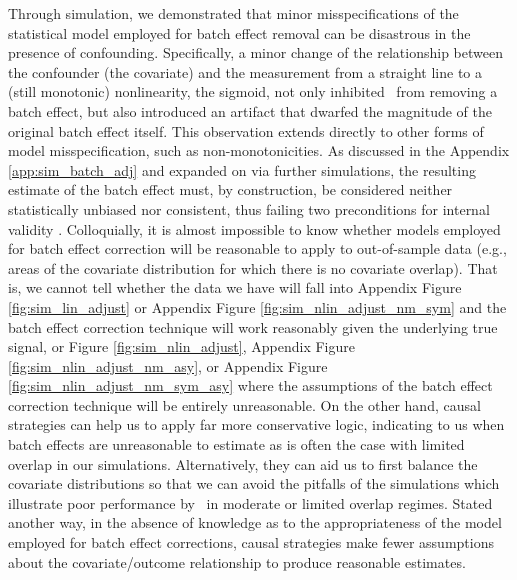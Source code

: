 Through simulation, we demonstrated that minor misspecifications of the statistical model employed for batch effect removal can be disastrous in the presence of confounding. Specifically, a minor change of the relationship between the confounder (the covariate) and the measurement from a straight line to a (still monotonic) nonlinearity, the sigmoid, not only inhibited \ccombat~from removing a batch effect, but also introduced an artifact that dwarfed the magnitude of the original batch effect itself. This observation extends directly to other forms of model misspecification, such as non-monotonicities. As discussed in the Appendix \ref{app:sim_batch_adj} and expanded on via further simulations, the resulting estimate of the batch effect must, by construction, be considered neither statistically unbiased nor consistent, thus failing two preconditions for internal validity \cite{Westreich2019Feb}. Colloquially, it is almost impossible to know whether models employed for batch effect correction will be reasonable to apply to out-of-sample data (e.g., areas of the covariate distribution for which there is no covariate overlap). That is, we cannot tell whether the data we have will fall into Appendix Figure \ref{fig:sim_lin_adjust} or Appendix Figure \ref{fig:sim_nlin_adjust_nm_sym} and the batch effect correction technique will work reasonably given the underlying true signal, or Figure \ref{fig:sim_nlin_adjust}, Appendix Figure \ref{fig:sim_nlin_adjust_nm_asy}, or Appendix Figure \ref{fig:sim_nlin_adjust_nm_sym_asy} where the assumptions of the batch effect correction technique will be entirely unreasonable. On the other hand, causal strategies can help us to apply far more conservative logic, indicating to us when batch effects are unreasonable to estimate as is often the case with limited overlap in our simulations. Alternatively, they can aid us to first balance the covariate distributions so that we can avoid the pitfalls of the simulations which illustrate poor performance by \ccombat~in moderate or limited overlap regimes. Stated another way, in the absence of knowledge as to the appropriateness of the model employed for batch effect corrections, causal strategies make fewer assumptions about the covariate/outcome relationship to produce reasonable estimates.

